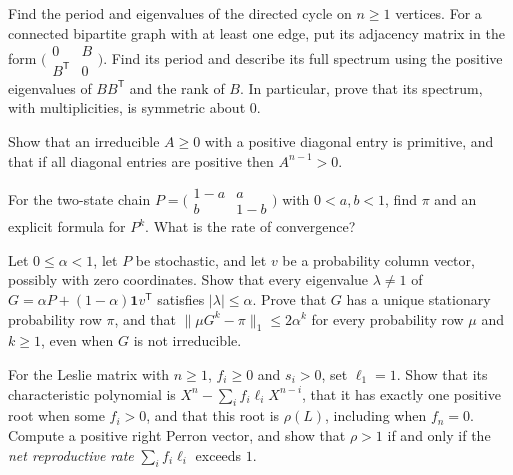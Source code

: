 \begin{exercise}[$\star\star$]\label{linear:ex:cycleperiod}
Find the period and eigenvalues of the directed cycle on $n\ge1$ vertices.
For a connected bipartite graph with at least one edge, put its adjacency
matrix in the form $\bigl(\begin{smallmatrix}0&B\\B^{\mathsf T}&0\end{smallmatrix}\bigr)$.
Find its period and describe its full spectrum using the positive eigenvalues
of $BB^{\mathsf T}$ and the rank of $B$. In particular, prove that its spectrum,
with multiplicities, is symmetric about $0$.
\end{exercise}

\begin{exercise}[$\star$]\label{linear:ex:diagpos}
Show that an irreducible $A\ge0$ with a positive diagonal entry is primitive, and that if all diagonal entries are positive then
$A^{n-1}>0$.
\end{exercise}

\begin{exercise}[$\star$]\label{linear:ex:twostate}
For the two-state chain $P=\bigl(\begin{smallmatrix}1-a&a\\b&1-b\end{smallmatrix}\bigr)$ with $0<a,b<1$, find $\pi$ and an
explicit formula for $P^k$. What is the rate of convergence?
\end{exercise}

\begin{exercise}[$\star\star$]\label{linear:ex:pagerankrate}
Let $0\le\alpha<1$, let $P$ be stochastic, and let $v$ be a probability
column vector, possibly with zero coordinates. Show that every eigenvalue
$\lambda\ne1$ of $G=\alpha P+(1-\alpha)\mathbf1v^{\mathsf T}$ satisfies
$|\lambda|\le\alpha$. Prove that $G$ has a unique stationary probability
row $\pi$, and that $\|\mu G^k-\pi\|_1\le2\alpha^k$ for every probability
row $\mu$ and $k\ge1$, even when $G$ is not irreducible.
\end{exercise}

\begin{exercise}[$\star\star$]\label{linear:ex:leslie}
For the Leslie matrix with $n\ge1$, $f_i\ge0$ and $s_i>0$, set $\ell_1=1$.
Show that its characteristic polynomial is $X^n-\sum_if_i\ell_iX^{n-i}$, that it has exactly one
positive root when some $f_i>0$, and that this root is $\rho(L)$, including when $f_n=0$.
Compute a positive right Perron vector, and show that $\rho>1$ if and only
if the \emph{net reproductive rate} $\sum_if_i\ell_i$ exceeds $1$.
\end{exercise}

